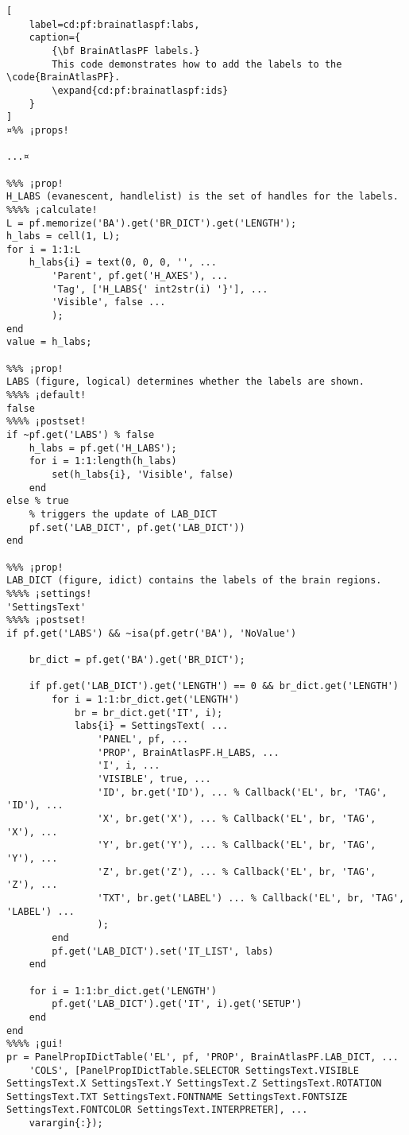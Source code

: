 \documentclass{tufte-handout}
\begin{document}
\begin{lstlisting}[
	label=cd:pf:brainatlaspf:labs,
	caption={
		{\bf BrainAtlasPF labels.}
		This code demonstrates how to add the labels to the \code{BrainAtlasPF}.
		\expand{cd:pf:brainatlaspf:ids}
	}
]
¤%% ¡props!

...¤
    
%%% ¡prop!
H_LABS (evanescent, handlelist) is the set of handles for the labels.
%%%% ¡calculate!
L = pf.memorize('BA').get('BR_DICT').get('LENGTH');
h_labs = cell(1, L);
for i = 1:1:L
    h_labs{i} = text(0, 0, 0, '', ...
        'Parent', pf.get('H_AXES'), ...
        'Tag', ['H_LABS{' int2str(i) '}'], ...
        'Visible', false ...
        );
end
value = h_labs;

%%% ¡prop!
LABS (figure, logical) determines whether the labels are shown.
%%%% ¡default!
false
%%%% ¡postset!
if ~pf.get('LABS') % false
    h_labs = pf.get('H_LABS');
    for i = 1:1:length(h_labs)
        set(h_labs{i}, 'Visible', false)
    end        
else % true
	% triggers the update of LAB_DICT
	pf.set('LAB_DICT', pf.get('LAB_DICT'))
end

%%% ¡prop!
LAB_DICT (figure, idict) contains the labels of the brain regions.
%%%% ¡settings!
'SettingsText'
%%%% ¡postset!
if pf.get('LABS') && ~isa(pf.getr('BA'), 'NoValue')

    br_dict = pf.get('BA').get('BR_DICT');

    if pf.get('LAB_DICT').get('LENGTH') == 0 && br_dict.get('LENGTH')
        for i = 1:1:br_dict.get('LENGTH')
            br = br_dict.get('IT', i);
            labs{i} = SettingsText( ...
                'PANEL', pf, ...
                'PROP', BrainAtlasPF.H_LABS, ...
                'I', i, ...
                'VISIBLE', true, ...
                'ID', br.get('ID'), ... % Callback('EL', br, 'TAG', 'ID'), ...
                'X', br.get('X'), ... % Callback('EL', br, 'TAG', 'X'), ...
                'Y', br.get('Y'), ... % Callback('EL', br, 'TAG', 'Y'), ...
                'Z', br.get('Z'), ... % Callback('EL', br, 'TAG', 'Z'), ...
                'TXT', br.get('LABEL') ... % Callback('EL', br, 'TAG', 'LABEL') ...
                );
        end
        pf.get('LAB_DICT').set('IT_LIST', labs)
    end
    
    for i = 1:1:br_dict.get('LENGTH')
        pf.get('LAB_DICT').get('IT', i).get('SETUP')
    end
end
%%%% ¡gui!
pr = PanelPropIDictTable('EL', pf, 'PROP', BrainAtlasPF.LAB_DICT, ...
    'COLS', [PanelPropIDictTable.SELECTOR SettingsText.VISIBLE SettingsText.X SettingsText.Y SettingsText.Z SettingsText.ROTATION SettingsText.TXT SettingsText.FONTNAME SettingsText.FONTSIZE SettingsText.FONTCOLOR SettingsText.INTERPRETER], ...
    varargin{:});


\end{lstlisting}
\end{document}
